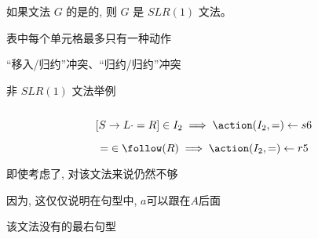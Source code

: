\begin{frame}{}
  \begin{definition}[$SLR(1)$文法]
    如果文法 $G$ 的是的,
    则 $G$ 是 $SLR(1)$ 文法。
  \end{definition}

  \vspace{0.30cm}
  \begin{center}
     \action{}表中每个单元格最多只有一种动作 \\[8pt]


     ``移入/归约''冲突、``归约/归约''冲突
  \end{center}
\end{frame}

\begin{frame}{}
  \begin{center}
    非 $SLR(1)$ 文法举例
  \end{center}

  \begin{columns}
  \end{columns}

  \vspace{0.30cm}
  \[
    [S \to L \cdot = R] \in I_{2} \implies \action(I_{2}, =) \gets s6
  \]

  \[
    =\; \in \follow(R) \implies \action(I_{2}, =) \gets r5
  \]
\end{frame}

\begin{frame}{}
  \begin{center}
    即使考虑了, 对该文法来说仍然不够

    \vspace{0.20cm}
    因为, 这仅仅说明在句型中, $a$可以跟在$A$后面


    该文法没有的最右句型
  \end{center}
\end{frame}

